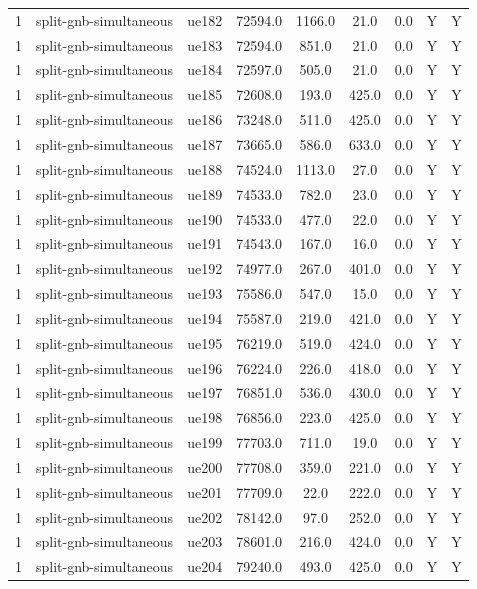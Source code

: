 \begin{table}[ht]
\begin{tabular}{|c|c|c|c|c|c|c|c|c|}
1 & split-gnb-simultaneous & ue182 & 72594.0 & 1166.0 & 21.0 & 0.0 & Y & Y \\
1 & split-gnb-simultaneous & ue183 & 72594.0 & 851.0 & 21.0 & 0.0 & Y & Y \\
1 & split-gnb-simultaneous & ue184 & 72597.0 & 505.0 & 21.0 & 0.0 & Y & Y \\
1 & split-gnb-simultaneous & ue185 & 72608.0 & 193.0 & 425.0 & 0.0 & Y & Y \\
1 & split-gnb-simultaneous & ue186 & 73248.0 & 511.0 & 425.0 & 0.0 & Y & Y \\
1 & split-gnb-simultaneous & ue187 & 73665.0 & 586.0 & 633.0 & 0.0 & Y & Y \\
1 & split-gnb-simultaneous & ue188 & 74524.0 & 1113.0 & 27.0 & 0.0 & Y & Y \\
1 & split-gnb-simultaneous & ue189 & 74533.0 & 782.0 & 23.0 & 0.0 & Y & Y \\
1 & split-gnb-simultaneous & ue190 & 74533.0 & 477.0 & 22.0 & 0.0 & Y & Y \\
1 & split-gnb-simultaneous & ue191 & 74543.0 & 167.0 & 16.0 & 0.0 & Y & Y \\
1 & split-gnb-simultaneous & ue192 & 74977.0 & 267.0 & 401.0 & 0.0 & Y & Y \\
1 & split-gnb-simultaneous & ue193 & 75586.0 & 547.0 & 15.0 & 0.0 & Y & Y \\
1 & split-gnb-simultaneous & ue194 & 75587.0 & 219.0 & 421.0 & 0.0 & Y & Y \\
1 & split-gnb-simultaneous & ue195 & 76219.0 & 519.0 & 424.0 & 0.0 & Y & Y \\
1 & split-gnb-simultaneous & ue196 & 76224.0 & 226.0 & 418.0 & 0.0 & Y & Y \\
1 & split-gnb-simultaneous & ue197 & 76851.0 & 536.0 & 430.0 & 0.0 & Y & Y \\
1 & split-gnb-simultaneous & ue198 & 76856.0 & 223.0 & 425.0 & 0.0 & Y & Y \\
1 & split-gnb-simultaneous & ue199 & 77703.0 & 711.0 & 19.0 & 0.0 & Y & Y \\
1 & split-gnb-simultaneous & ue200 & 77708.0 & 359.0 & 221.0 & 0.0 & Y & Y \\
1 & split-gnb-simultaneous & ue201 & 77709.0 & 22.0 & 222.0 & 0.0 & Y & Y \\
1 & split-gnb-simultaneous & ue202 & 78142.0 & 97.0 & 252.0 & 0.0 & Y & Y \\
1 & split-gnb-simultaneous & ue203 & 78601.0 & 216.0 & 424.0 & 0.0 & Y & Y \\
1 & split-gnb-simultaneous & ue204 & 79240.0 & 493.0 & 425.0 & 0.0 & Y & Y \\

\end{tabular}
\end{table}
